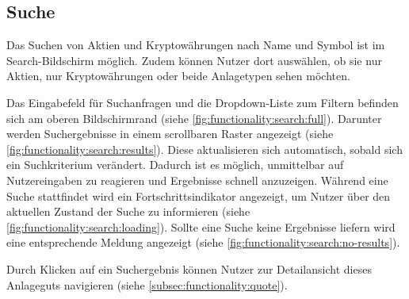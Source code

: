 \documentclass[a4paper]{article}
\begin{document}
\subsection{Suche}
\label{subsec:functionality:search}
Das Suchen von Aktien und Kryptowährungen nach Name und Symbol ist im Search-Bildschirm möglich.
Zudem können Nutzer dort auswählen, ob sie nur Aktien, nur Kryptowährungen oder beide Anlagetypen sehen möchten.

Das Eingabefeld für Suchanfragen und die Dropdown-Liste zum Filtern befinden sich am oberen Bildschirmrand (siehe \autoref{fig:functionality:search:full}).
Darunter werden Suchergebnisse in einem scrollbaren Raster angezeigt (siehe \autoref{fig:functionality:search:results}).
Diese aktualisieren sich automatisch, sobald sich ein Suchkriterium verändert.
Dadurch ist es möglich, unmittelbar auf Nutzereingaben zu reagieren und Ergebnisse schnell anzuzeigen.
Während eine Suche stattfindet wird ein Fortschritts\-indikator angezeigt, um Nutzer über den aktuellen Zustand der Suche zu informieren (siehe \autoref{fig:functionality:search:loading}).
Sollte eine Suche keine Ergebnisse liefern wird eine entsprechende Meldung angezeigt (siehe \autoref{fig:functionality:search:no-results}).

Durch Klicken auf ein Suchergebnis können Nutzer zur Detailansicht dieses Anlageguts navigieren (siehe \autoref{subsec:functionality:quote}).
\end{document}
